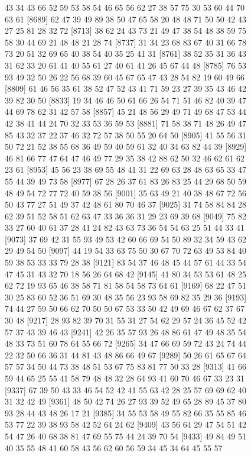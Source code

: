 \documentclass{article}
\begin{document}
\begin{figure}[H]
\begin{Schunk}
\begin{Soutput}
 [8665] 43 34 43 66 52 59 53 58 54 46 65 56 62 27 38 57 75 30 53 60 44 70 63 61
 [8689] 62 47 39 49 89 38 50 47 65 58 20 48 48 71 50 50 42 43 27 25 81 28 32 72
 [8713] 38 62 24 43 73 21 49 47 38 54 48 38 59 75 58 30 44 69 21 48 48 21 28 74
 [8737] 31 34 23 68 83 67 40 31 66 78 73 20 51 32 69 65 40 38 54 40 35 25 41 31
 [8761] 38 52 35 31 36 43 31 62 33 20 61 41 40 55 61 27 40 61 41 26 45 67 44 48
 [8785] 76 53 93 49 32 50 26 22 56 68 39 60 45 67 65 47 43 28 54 82 19 60 49 66
 [8809] 61 46 56 35 61 38 52 47 52 43 41 71 59 23 27 39 35 43 46 42 39 82 30 50
 [8833] 19 34 46 46 50 61 66 26 54 71 51 46 82 40 39 47 44 69 78 62 31 42 57 58
 [8857] 45 21 48 56 29 49 71 49 68 47 53 44 42 38 41 44 24 70 32 33 53 36 59 53
 [8881] 71 58 38 71 48 26 49 47 85 43 32 37 22 37 46 32 72 57 38 50 55 20 64 50
 [8905] 41 55 56 31 50 72 21 52 38 55 68 36 49 59 40 59 61 32 40 34 63 82 44 39
 [8929] 46 81 66 77 47 64 47 46 49 77 29 35 38 42 88 62 50 32 46 62 61 62 23 61
 [8953] 45 56 23 38 69 55 48 41 31 22 69 63 28 48 63 65 33 47 55 44 39 49 73 58
 [8977] 67 28 26 37 61 83 26 83 25 44 29 68 50 59 48 49 54 72 77 72 40 59 38 56
 [9001] 35 63 49 21 40 38 48 67 72 56 50 43 77 27 51 49 37 42 48 61 80 70 46 37
 [9025] 31 74 58 84 84 28 62 39 51 52 58 51 62 63 47 33 36 36 31 29 23 69 39 68
 [9049] 75 82 33 27 60 40 61 37 28 41 24 82 43 63 73 36 54 54 63 25 51 44 33 41
 [9073] 37 69 42 31 55 93 49 53 42 60 66 69 54 50 89 32 34 59 43 62 29 49 54 50
 [9097] 44 19 54 33 63 75 50 30 67 70 72 63 49 53 84 40 59 38 53 33 33 79 28 38
 [9121] 83 54 37 46 48 45 44 57 61 44 33 54 47 45 31 43 32 70 18 56 26 64 68 42
 [9145] 41 80 34 53 53 61 48 25 62 72 19 93 65 46 38 58 71 81 58 54 58 73 64 61
 [9169] 68 22 47 51 30 25 83 60 52 36 51 69 30 48 35 56 23 93 58 69 82 35 29 36
 [9193] 74 44 27 59 50 66 62 70 50 50 67 53 33 50 42 49 69 46 67 62 37 67 30 48
 [9217] 28 93 82 39 70 31 55 31 27 54 62 29 57 24 36 45 52 42 57 37 43 39 46 43
 [9241] 42 26 35 57 93 26 48 86 61 47 49 48 35 54 48 33 73 51 60 78 64 55 66 72
 [9265] 34 47 66 69 59 72 43 24 74 44 22 32 50 66 36 31 44 81 43 48 86 66 49 67
 [9289] 50 26 61 65 67 64 57 57 34 50 44 73 38 48 51 53 67 75 83 81 77 50 33 28
 [9313] 41 66 59 44 65 25 55 41 58 79 48 48 32 28 64 93 41 60 70 46 67 33 23 31
 [9337] 67 39 50 43 33 46 54 52 42 41 55 63 42 28 25 57 69 69 62 40 31 32 42 49
 [9361] 48 50 42 74 26 27 93 39 52 49 65 28 89 45 37 80 93 28 44 43 48 26 17 21
 [9385] 34 55 53 58 49 55 82 66 35 55 85 46 53 77 22 39 38 93 58 42 52 64 24 62
 [9409] 43 56 64 29 47 54 51 42 54 47 26 40 68 38 81 47 69 55 75 44 24 39 70 54
 [9433] 49 84 49 51 40 35 55 48 41 60 58 43 56 62 60 56 59 34 45 34 64 45 55 57

\end{Soutput}
\end{Schunk}
\end{figure}
\end{document}
